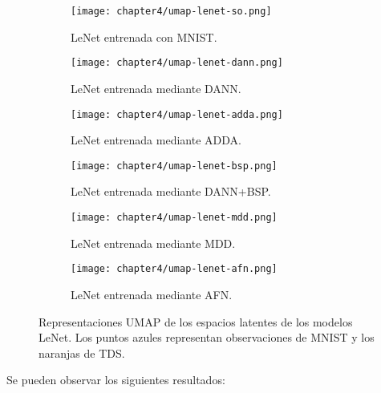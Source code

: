 \begin{figure}[H]
    \centering
    \begin{subfigure}[h]{0.40\textwidth}
        \texttt{[image: chapter4/umap-lenet-so.png]}
        \caption{LeNet entrenada con MNIST.}
        \label{fig:umap-lenet-so}
    \end{subfigure}
    \hfill
    \begin{subfigure}[h]{0.40\textwidth}
        \texttt{[image: chapter4/umap-lenet-dann.png]}
        \caption{LeNet entrenada mediante DANN.}
        \label{fig:umap-lenet-dann}
    \end{subfigure}
    \hfill
    \begin{subfigure}[h]{0.40\textwidth}
        \texttt{[image: chapter4/umap-lenet-adda.png]}
        \caption{LeNet entrenada mediante ADDA.}
        \label{fig:umap-lenet-adda}
    \end{subfigure}
    \hfill
    \begin{subfigure}[h]{0.40\textwidth}
        \texttt{[image: chapter4/umap-lenet-bsp.png]}
        \caption{LeNet entrenada mediante DANN+BSP.}
        \label{fig:umap-lenet-bsp}
    \end{subfigure}
    \hfill
    \begin{subfigure}[h]{0.40\textwidth}
        \texttt{[image: chapter4/umap-lenet-mdd.png]}
        \caption{LeNet entrenada mediante MDD.}
        \label{fig:umap-lenet-mdd}
    \end{subfigure}
    \hfill
    \begin{subfigure}[h]{0.40\textwidth}
        \texttt{[image: chapter4/umap-lenet-afn.png]}
        \caption{LeNet entrenada mediante AFN.}
        \label{fig:umap-lenet-afn}
    \end{subfigure}

    \caption{Representaciones UMAP de los espacios latentes de los modelos LeNet. Los puntos azules representan observaciones de MNIST y los naranjas de TDS.}
    \label{fig:umaps-lenet}
\end{figure}

Se pueden observar los siguientes resultados:


